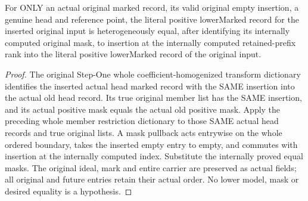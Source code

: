 \begin{theorem}
\label{hir:positive-member-empty-actual}
\leanok
For ONLY an actual original marked record, its valid original empty insertion, a genuine head and reference point, the literal positive lowerMarked record for the inserted original input is heterogeneously equal, after identifying its internally computed original mask, to insertion at the internally computed retained-prefix rank into the literal positive lowerMarked record of the original input.
\end{theorem}
\begin{proof}
The original Step-One whole coefficient-homogenized transform dictionary identifies the inserted actual head marked record with the SAME insertion into the actual old head record. Its true original member list has the SAME insertion, and its actual positive mask equals the actual old positive mask. Apply the preceding whole member restriction dictionary to those SAME actual head records and true original lists. A mask pullback acts entrywise on the whole ordered boundary, takes the inserted empty entry to empty, and commutes with insertion at the internally computed index. Substitute the internally proved equal masks. The original ideal, mark and entire carrier are preserved as actual fields; all original and future entries retain their actual order. No lower model, mask or desired equality is a hypothesis.
\end{proof}

